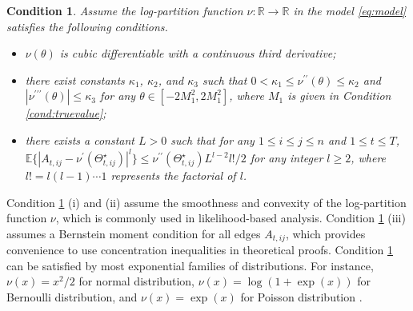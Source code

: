 \documentclass[12pt]{article}
\newcommand{\blue}[1]{\textcolor{blue}{#1}}
\newtheorem{condition}{Condition}
\newcommand{\EXPT}{\mathbb{E}}
\begin{document}
\begin{condition} \label{cond:parfunction}
Assume the log-partition function $\nu: \mathbb{R}\to \mathbb{R}$ in the model \eqref{eq:model} satisfies the following conditions. 
\begin{itemize}\setlength{\itemsep}{0pt}
\item[(i)] $\nu(\theta)$ is cubic differentiable with a continuous third derivative;

\item[(ii)] there exist constants $\kappa_1$, $\kappa_2$, and $\kappa_3$ such that $0 < \kappa_1 \leqslant \nu^{\prime\prime}(\theta) \leqslant \kappa_2$ and $|\nu^{\prime\prime\prime}(\theta)| \leqslant \kappa_3$ for any $\theta \in [-2M_1^2, 2M_1^2]$, where $M_1$ is given in Condition \ref{cond:truevalue};
 
\item[(iii)] there exists a constant $L>0$ such that for any  $1 \leqslant i \leqslant j \leqslant n$ and $1 \leqslant t \leqslant T$, $\EXPT \{|A_{t,ij} - \nu^{\prime}(\Theta_{t,ij}^\star) |^{l}\} \leqslant \nu^{\prime\prime}(\Theta_{t,ij}^\star) L^{l -2} l ! /2$ for any {integer} $l \geqslant 2$, {where $l!=l(l-1)\cdots 1$ represents the factorial of $l$.}
\end{itemize}
\end{condition}

Condition \ref{cond:parfunction} (i) and (ii) assume the smoothness and convexity of the log-partition function $\nu$, which is commonly used in likelihood-based analysis. Condition \ref{cond:parfunction} (iii) assumes a  Bernstein moment condition  for all edges $A_{t,ij}$, which provides convenience to use  concentration inequalities in theoretical proofs. Condition \ref{cond:parfunction} can be satisfied by most exponential families of distributions. For instance, $\nu(x)={x^2}/{2}$ for normal distribution, $\nu(x)=\log(1+\exp(x))$ for Bernoulli distribution, and $\nu(x)=\exp(x)$ for Poisson distribution \citep{efron2022exponential}.  %




\end{document}
